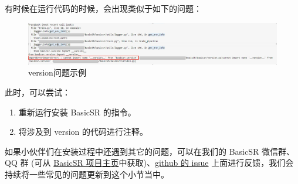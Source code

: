 \documentclass[../main.tex]{subfiles}
\begin{document}
\begin{enumerate}
    有时候在运行代码的时候，会出现类似于如下的问题：
    \begin{figure}[H]
    \begin{center}
        \includegraphics[width=0.8\linewidth]{figures/installation_version.jpg}
        \caption{version问题示例}
        \label{fig:version}
    \end{center}
    \vspace{-0.5cm}
    \end{figure}
    此时，可以尝试：
    \begin{enumerate}
        \item 重新运行安装 BasicSR 的指令。
        \item 将涉及到 version 的代码进行注释。
    \end{enumerate}

\end{enumerate}

\begin{hl}
    如果小伙伴们在安装过程中还遇到其它的问题，可以在我们的 BasicSR 微信群、 QQ 群 (可从 \href{https://github.com/XPixelGroup/BasicSR/blob/master/README_CN.md}{BasicSR 项目主页}中获取)、\href{https://github.com/XPixelGroup/BasicSR/issues}{github 的 issue} 上面进行反馈，我们会持续将一些常见的问题更新到这个小节当中。
\end{hl}
\end{document}
